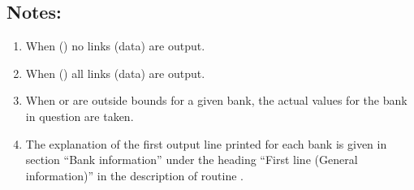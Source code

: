 \subsection*{Notes:}
\par
\begin{enumerate}
\item When  () no links (data) are output.
\item When  () all links (data) are
output.
\item When  or  are outside bounds for a given bank, the
actual values for the bank in question are taken.
\item The explanation of the
first output line printed for each bank is given in section ``Bank information''
under the heading ``First line (General information)'' in the
description of routine .
\end{enumerate}

